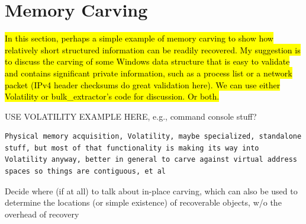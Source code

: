 \section{Memory Carving}

\hl{In this section, perhaps a simple example of memory carving to
  show how relatively short structured information can be readily
  recovered. My suggestion is to discuss the carving of some Windows
  data structure that is easy to validate and contains significant
  private information, such as a process list or a network packet
  (IPv4 header checksums do great validation here). We can use either
  Volatility or bulk\_extractor's code for discussion. Or both. }

USE VOLATILITY EXAMPLE HERE, e.g., command console stuff?


\begin{Verbatim}
Physical memory acquisition, Volatility, maybe specialized, standalone
stuff, but most of that functionality is making its way into
Volatility anyway, better in general to carve against virtual address
spaces so things are contiguous, et al
\end{Verbatim}


\color{red}
Decide where (if at all) to talk about in-place carving, which can also be used to determine the locations (or simple existence) of recoverable objects, w/o the overhead of recovery
\color{black}



